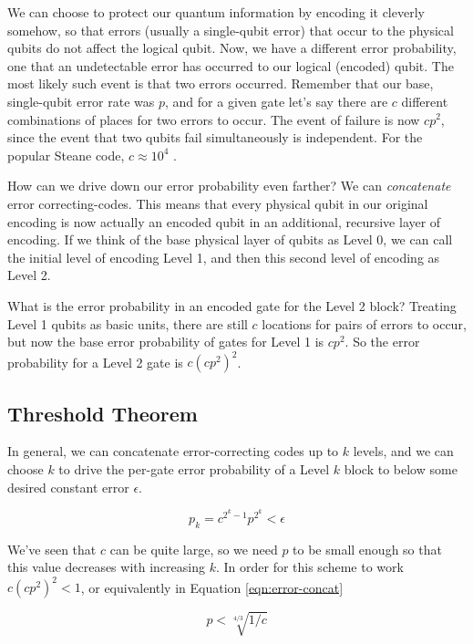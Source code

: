 We can choose to protect
our quantum information by encoding it cleverly somehow, so that
errors (usually a single-qubit error)
that occur to the physical qubits do not
affect the logical qubit.
Now, we have a different error probability, one that an undetectable error
has occurred to our logical (encoded) qubit. The most likely such event is that
two errors occurred. Remember that our base, single-qubit error rate was
$p$, and for a given gate let's say there are $c$ different combinations of
places for two errors to occur. The event of failure is now $cp^2$, since the
event that two qubits fail simultaneously is independent. For the
popular Steane
code, $c \approx 10^4$ \cite{Nielsen2000}.

How can we drive down our error probability even farther?
We can \emph{concatenate} error correcting-codes. This means
that every physical qubit in our original encoding is now actually an
encoded qubit in an additional, recursive layer of encoding. If we think of
the base physical layer of qubits as Level 0, we can call the
initial level of encoding Level 1, and then this second level of encoding
as Level 2.

What is the error probability in an encoded gate for the Level 2 block?
Treating Level 1 qubits as basic units, there are still $c$ locations for
pairs of errors to occur, but now the base error probability of gates for
Level 1 is $cp^2$. So the error probability for a Level 2 gate is
$c(cp^2)^2$.

\subsection{Threshold Theorem}

In general, we can concatenate error-correcting codes up to $k$ levels, and
we can choose $k$ to drive the per-gate error probability of a Level $k$ block
to below some desired constant error $\epsilon$.

\begin{equation}
p_k = c^{2^k-1}p^{2^k} < \epsilon
\end{equation}

We've seen that $c$ can be quite large, so we need $p$ to be small enough
so that this value decreases with increasing $k$. In order for this scheme
to work $c(cp^2)^2 < 1$, or equivalently in Equation \ref{eqn:error-concat} 

\begin{equation}
p < \sqrt[4/3]{1/c}
\label{eqn:error-concat}
\end{equation}

